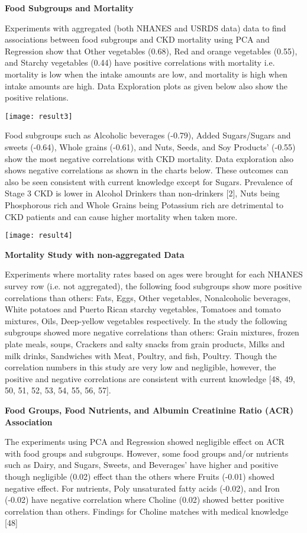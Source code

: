 \noindent \textbf{Food Subgroups and Mortality}


\noindent Experiments with aggregated (both NHANES and USRDS data) data to find associations between food subgroups and CKD mortality using PCA and Regression show that  Other vegetables (0.68),    Red and orange vegetables (0.55), and Starchy vegetables (0.44)  have positive correlations with mortality i.e. mortality is low when the intake amounts are low, and mortality is high when intake amounts are high. Data Exploration plots as given below also show the positive relations.

\medskip \medskip 
\texttt{[image: result3]}
\medskip  

\noindent  Food subgroups such as Alcoholic beverages (-0.79),    Added Sugars/Sugars and sweets (-0.64), Whole grains (-0.61), and  Nuts, Seeds, and Soy Products’ (-0.55) show the most negative correlations with CKD mortality. Data exploration also shows negative correlations as shown in the charts below. These outcomes can also be seen consistent with current knowledge except for Sugars. Prevalence of Stage 3 CKD is lower in Alcohol Drinkers than non-drinkers [2], Nuts being Phosphorous rich and Whole Grains being Potassium rich are detrimental to CKD patients and can cause higher mortality when taken more.
\medskip 

\texttt{[image: result4]}
\medskip 

\noindent \textbf{Mortality Study with non-aggregated Data}

\noindent Experiments where mortality rates based on ages were brought for each NHANES survey row (i.e. not aggregated), the following food subgroups show more positive correlations than others: Fats, Eggs, Other vegetables, Nonalcoholic beverages, White potatoes and Puerto Rican starchy vegetables, Tomatoes and tomato mixtures, Oils, Deep-yellow vegetables respectively. In the study the following subgroups showed more negative correlations than others: Grain mixtures, frozen plate meals, soups, Crackers and salty snacks from grain products, Milks and milk drinks, Sandwiches with Meat, Poultry, and fish, Poultry. Though the correlation numbers in this study are very low and negligible, however, the positive and negative correlations are consistent with current knowledge [48, 49, 50, 51, 52, 53, 54, 55, 56, 57].

\medskip  
\noindent \textbf{Food Groups, Food Nutrients, and Albumin Creatinine Ratio (ACR) Association}

\noindent The experiments using PCA and Regression showed negligible effect on ACR with food groups and subgroups. However, some food groups and/or nutrients such as Dairy, and  Sugars, Sweets, and Beverages’  have higher and positive though negligible (0.02) effect than the others where Fruits (-0.01) showed negative effect.  For nutrients, Poly unsaturated fatty acids (-0.02), and Iron (-0.02) have negative correlation where Choline (0.02) showed better positive correlation than others. Findings for Choline matches with medical knowledge [48]

